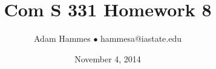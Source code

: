 \documentclass[11pt]{article}
\begin{document}
\title{Com S 331 Homework 8}
\author{Adam Hammes $\bullet$ hammesa@iastate.edu}
\date{November 4, 2014}
\maketitle
\end{document}
